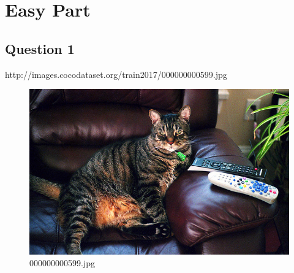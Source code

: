 \section{Easy Part}
\subsection*{Question 1} 
http://images.cocodataset.org/train2017/000000000599.jpg
    \begin{figure}[h]
        \centering
        \includegraphics[width=0.8\linewidth]{../image set/easy/000000000599.jpg}
        \caption{000000000599.jpg}
    \end{figure}
